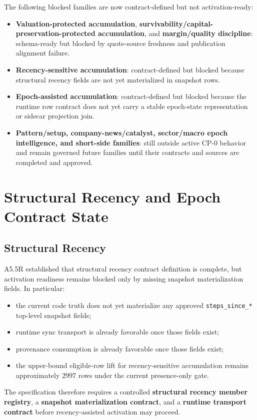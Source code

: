 The following blocked families are now contract-defined but not activation-ready:
\begin{itemize}
    \item \textbf{Valuation-protected accumulation}, \textbf{survivability/capital-preservation-protected accumulation}, and \textbf{margin/quality discipline}: schema-ready but blocked by quote-source freshness and publication alignment failure.
    \item \textbf{Recency-sensitive accumulation}: contract-defined but blocked because structural recency fields are not yet materialized in snapshot rows.
    \item \textbf{Epoch-assisted accumulation}: contract-defined but blocked because the runtime row contract does not yet carry a stable epoch-state representation or sidecar projection join.
    \item \textbf{Pattern/setup, company-news/catalyst, sector/macro epoch intelligence, and short-side families}: still outside active CP-0 behavior and remain governed future families until their contracts and sources are completed and approved.
\end{itemize}

\section{Structural Recency and Epoch Contract State}

\subsection{Structural Recency}
A5.5R established that structural recency contract definition is complete, but activation readiness remains blocked only by missing snapshot materialization fields. In particular:
\begin{itemize}
    \item the current code truth does not yet materialize any approved \texttt{steps\_since\_*} top-level snapshot fields;
    \item runtime sync transport is already favorable once those fields exist;
    \item provenance consumption is already favorable once those fields exist;
    \item the upper-bound eligible-row lift for recency-sensitive accumulation remains approximately $2997$ rows under the current presence-only gate.
\end{itemize}
The specification therefore requires a controlled \textbf{structural recency member registry}, a \textbf{snapshot materialization contract}, and a \textbf{runtime transport contract} before recency-assisted activation may proceed.

